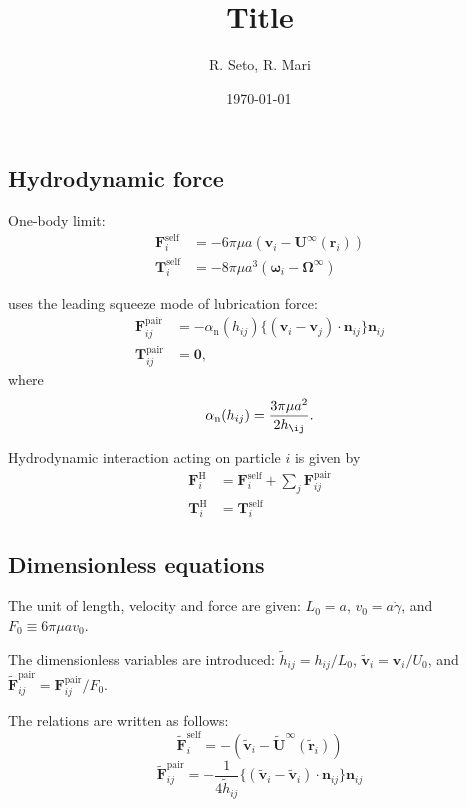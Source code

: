 \documentclass[12pt]{article}
\title{Title}
\date{\shortdate\today \, \ampmtime }
\author{R. Seto, R. Mari}
\begin{document}
\maketitle


\subsection*{Hydrodynamic force}

One-body limit:
\begin{align}
 \bm{F}_i^{\mathrm{self}} &= 
-6 \pi \mu a ( \bm{v}_i - \bm{U}^{\infty} (\bm{r}_i) ) \\
 \bm{T}_i^{\mathrm{self}} &= 
-8 \pi \mu a^3 ( \bm{\omega}_i - \bm{\Omega}^{\infty})
\end{align}

\citet{Melrose_2004a} uses 
the leading squeeze mode of lubrication force:
\begin{align}
 \bm{F}_{ij}^{\mathrm{pair}}
&=
- \alpha_{\mathrm{n}}(h_{ij})
\bigl\{
(\bm{v}_i - \bm{v}_j)
\cdot \bm{n}_{ij}
\bigr\}
\bm{n}_{ij} \\
 \bm{T}_{ij}^{\mathrm{pair}}
&=
\bm{0},
\end{align}
where
\begin{equation}
 \alpha_{\mathrm{n}}(h_{ij}) = 
\frac{3 \pi \mu a^2}{2 h_{\ij}}.
\end{equation}



Hydrodynamic interaction acting on particle $i$
is given by
\begin{align}
\bm{F}_i^{\mathrm{H}}
&=
\bm{F}_i^{\mathrm{self}}
+
\sum_j
\bm{F}_{ij}^{\mathrm{pair}} \\
\bm{T}_i^{\mathrm{H}}
&=
\bm{T}_i^{\mathrm{self}}
\end{align}
\newpage
\subsection*{Dimensionless equations}

The unit of length, velocity and force 
are given:
$L_0 = a$,  $v_0 = a \dot{\gamma}$, and $F_0 \equiv 6 \pi \mu a v_0$.

The dimensionless variables are introduced:
$\tilde{h}_{ij} = h_{ij} / L_0$,
$\tilde{\bm{v}}_i = \bm{v}_i / U_0$,
and $\tilde{\bm{F}}_{ij}^{\mathrm{pair}} = \bm{F}_{ij}^{\mathrm{pair}} / F_0$.

The relations are written as follows:
\begin{equation}
 \tilde{\bm{F}}_i^{\mathrm{self}} = 
-( \tilde{\bm{v}}_i - 
\tilde{\bm{U}}^{\infty} 
(\tilde{\bm{r}}_i) )
\end{equation}
\begin{equation}
 \tilde{\bm{F}}_{ij}^{\mathrm{pair}}
= 
- \frac{1}{4 \tilde{h}_{ij}}
\bigl\{
(\tilde{\bm{v}}_i-
\tilde{\bm{v}}_i)\cdot
\bm{n}_{ij}
\bigr\}\bm{n}_{ij}
\end{equation}
\end{document}
